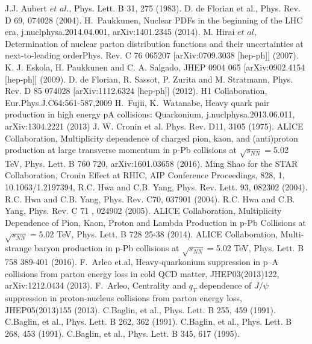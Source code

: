\begin{thebibliography}{4}
 J.J. Aubert $et$ $al$., Phys. Lett. B 31, 275 (1983). 
 D. de Florian et al., Phys. Rev. D 69, 074028 (2004).
 H.~Paukkunen, Nuclear PDFs in the beginning of the LHC era, j.nuclphysa.2014.04.001, arXiv:1401.2345 (2014).
 M. Hirai $et$ $al$, Determination of nuclear parton distribution functions and their uncertainties at next-to-leading orderPhys. Rev. C 76 065207 [arXiv:0709.3038 [hep-ph]] (2007).
  K. J. Eskola, H. Paukkunen and C. A. Salgado, JHEP 0904 065 [arXiv:0902.4154 [hep-ph]] (2009).
   D. de Florian, R. Sassot, P. Zurita and M. Stratmann, Phys. Rev. D 85 074028 [arXiv:1112.6324 [hep-ph]] (2012).
 H1 Collaboration, Eur.Phys.J.C64:561-587,2009
 H.~Fujii, K.~Watanabe, Heavy quark pair production in high energy pA collisions: Quarkonium, j.nuclphysa.2013.06.011,  arXiv:1304.2221 (2013)
 J. W. Cronin et al. Phys. Rev. D11, 3105 (1975).
 ALICE Collaboration, Multiplicity dependence of charged pion, kaon, and (anti)proton production at large transverse momentum in p-Pb collisions at $\sqrt{s_{NN}}=$5.02 TeV, Phys. Lett. B 760 720, arXiv:1601.03658 (2016).
 Ming Shao for the STAR Collaboration, Cronin Effect at RHIC, AIP Conference Proceedings, 828, 1, 10.1063/1.2197394, 
 R.C. Hwa and C.B. Yang, Phys. Rev. Lett. 93, 082302 (2004). 
 R.C. Hwa and C.B. Yang, Phys. Rev. C70, 037901 (2004).
 R.C. Hwa and C.B. Yang, Phys. Rev. C 71 , 024902 (2005).
 ALICE Collaboration, Multiplicity Dependence of Pion, Kaon, Proton and Lambda Production in p-Pb Collisions at $\sqrt{s_{NN}}=$5.02 TeV, Phys. Lett. B 728 25-38 (2014).
 ALICE Collaboration, Multi-strange baryon production in p-Pb collisions at $\sqrt{s_{NN}}=$5.02 TeV, Phys. Lett. B 758 389-401 (2016).
 F.~Arleo et.al, Heavy-quarkonium suppression in p–A collisions from parton energy loss in cold QCD matter, JHEP03(2013)122, arXiv:1212.0434 (2013).
 F.~Arleo, Centrality and $q_{T}$ dependence of $J/\psi$ suppression in proton-nucleus collisions from parton energy loss, JHEP05(2013)155 (2013).
 C.Baglin, et al., Phys. Lett. B 255, 459 (1991).
 C.Baglin, et al., Phys. Lett. B 262, 362 (1991).
 C.Baglin, et al., Phys. Lett. B 268, 453 (1991).
 C.Baglin, et al., Phys. Lett. B 345, 617 (1995).

\end{thebibliography}
